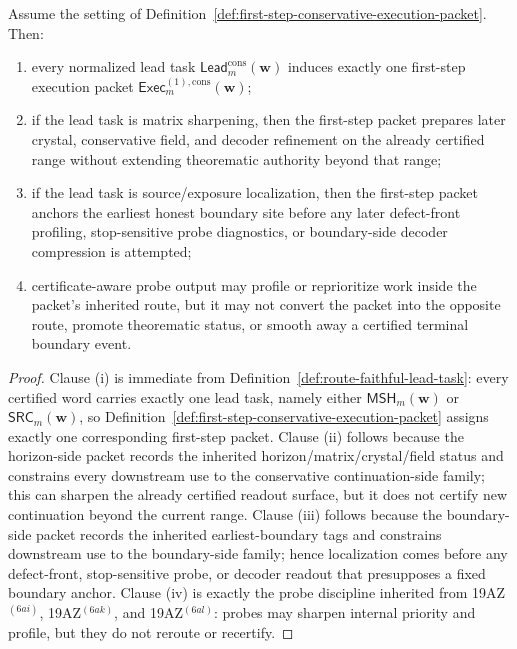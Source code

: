 \begin{proposition}
\label{prop:every-normalized-lead-task-induces-exactly-one-first-step-conservative-execution-packet}
Assume the setting of Definition~\ref{def:first-step-conservative-execution-packet}. Then:
\begin{enumerate}[label=(\roman*)]
 \item every normalized lead task \(\mathsf{Lead}^{\mathrm{cons}}_{m}(\mathbf w)\) induces exactly one first-step execution packet \(\mathsf{Exec}^{(1),\mathrm{cons}}_{m}(\mathbf w)\);
 \item if the lead task is matrix sharpening, then the first-step packet prepares later crystal, conservative field, and decoder refinement on the already certified range without extending theorematic authority beyond that range;
 \item if the lead task is source/exposure localization, then the first-step packet anchors the earliest honest boundary site before any later defect-front profiling, stop-sensitive probe diagnostics, or boundary-side decoder compression is attempted;
 \item certificate-aware probe output may profile or reprioritize work inside the packet's inherited route, but it may not convert the packet into the opposite route, promote theorematic status, or smooth away a certified terminal boundary event.
\end{enumerate}
\end{proposition}

\begin{proof}
Clause (i) is immediate from Definition~\ref{def:route-faithful-lead-task}: every certified word carries exactly one lead task, namely either \(\mathsf{MSH}_{m}(\mathbf w)\) or \(\mathsf{SRC}_{m}(\mathbf w)\), so Definition~\ref{def:first-step-conservative-execution-packet} assigns exactly one corresponding first-step packet. Clause (ii) follows because the horizon-side packet records the inherited horizon/matrix/crystal/field status and constrains every downstream use to the conservative continuation-side family; this can sharpen the already certified readout surface, but it does not certify new continuation beyond the current range. Clause (iii) follows because the boundary-side packet records the inherited earliest-boundary tags and constrains downstream use to the boundary-side family; hence localization comes before any defect-front, stop-sensitive probe, or decoder readout that presupposes a fixed boundary anchor. Clause (iv) is exactly the probe discipline inherited from 19AZ$^{(6ai)}$, 19AZ$^{(6ak)}$, and 19AZ$^{(6al)}$: probes may sharpen internal priority and profile, but they do not reroute or recertify.
\end{proof}

